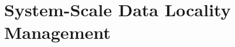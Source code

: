 \chapter{System-Scale Data Locality Management}
\label{ch:systemscale}




%   
%   
%   
%   
%   
%   
%   
